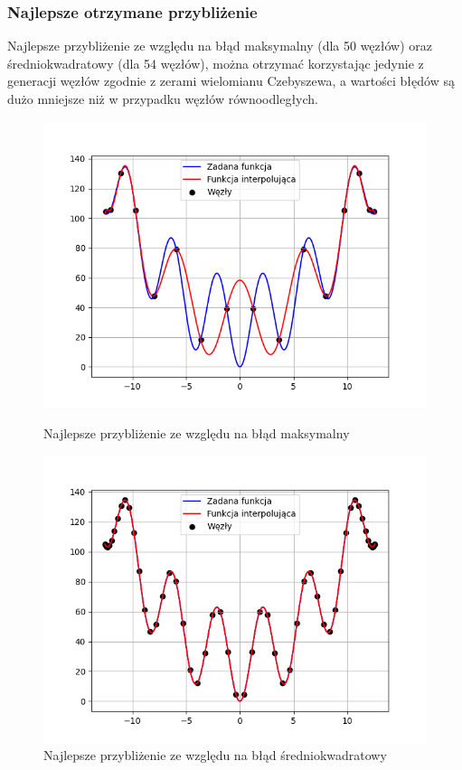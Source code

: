 \documentclass{article}
\begin{document}
\subsubsection{Najlepsze otrzymane przybliżenie}

Najlepsze przybliżenie ze względu na błąd maksymalny (dla 50 węzłów) oraz średniokwadratowy (dla 54 węzłów), można otrzymać korzystając jedynie z generacji węzłów zgodnie z zerami wielomianu Czebyszewa, a wartości błędów są dużo mniejsze niż w przypadku węzłów równoodległych.

\begin{figure}[H]
  \begin{minipage}[b]{0.49\textwidth}
    \includegraphics[width=\textwidth]{img03.png}
    \caption{Najlepsze przybliżenie ze względu na błąd maksymalny}
  \end{minipage}
  \hfill
  \begin{minipage}[b]{0.49\textwidth}
    \includegraphics[width=\textwidth]{img04.png}
    \caption{Najlepsze przybliżenie ze względu na błąd średniokwadratowy}
  \end{minipage}
\end{figure}
\end{document}
